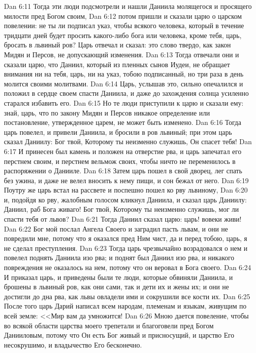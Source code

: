 \vs Dan 6:11 Тогда эти люди подсмотрели и нашли Даниила молящегося и просящего милости пред Богом своим,
\vs Dan 6:12 потом пришли и сказали царю о царском повелении: не ты ли подписал указ, чтобы всякого человека, который в течение тридцати дней будет просить какого-либо бога или человека, кроме тебя, царь, бросать в львиный ров? Царь отвечал и сказал: это слово твердо, как закон Мидян и Персов, не допускающий изменения.
\vs Dan 6:13 Тогда отвечали они и сказали царю, что Даниил, который из пленных сынов Иудеи, не обращает внимания ни на тебя, царь, ни на указ, тобою подписанный, но три раза в день молится своими молитвами.
\vs Dan 6:14 Царь, услышав это, сильно опечалился и положил в сердце своем спасти Даниила, и даже до захождения солнца усиленно старался избавить его.
\vs Dan 6:15 Но те люди приступили к царю и сказали ему: знай, царь, что по закону Мидян и Персов никакое определение или постановление, утвержденное царем, не может быть изменено.
\vs Dan 6:16 Тогда царь повелел, и привели Даниила, и бросили в ров львиный; при этом царь сказал Даниилу: Бог твой, Которому ты неизменно служишь, Он спасет тебя!
\vs Dan 6:17 И принесен был камень и положен на отверстие рва, и царь запечатал его перстнем своим, и перстнем вельмож своих, чтобы ничто не переменилось в распоряжении о Данииле.
\vs Dan 6:18 Затем царь пошел в свой дворец, лег спать без ужина, и даже не велел вносить к нему пищи, и сон бежал от него.
\vs Dan 6:19 Поутру же царь встал на рассвете и поспешно пошел ко рву львиному,
\vs Dan 6:20 и, подойдя ко рву, жалобным голосом кликнул Даниила, и сказал царь Даниилу: Даниил, раб Бога живаго! Бог твой, Которому ты неизменно служишь, мог ли спасти тебя от львов?
\vs Dan 6:21 Тогда Даниил сказал царю: царь! вовеки живи!
\vs Dan 6:22 Бог мой послал Ангела Своего и заградил пасть львам, и они не повредили мне, потому что я оказался пред Ним чист, да и перед тобою, царь, я не сделал преступления.
\vs Dan 6:23 Тогда царь чрезвычайно возрадовался о нем и повелел поднять Даниила изо рва; и поднят был Даниил изо рва, и никакого повреждения не оказалось на нем, потому что он веровал в Бога своего.
\vs Dan 6:24 И приказал царь, и приведены были те люди, которые обвиняли Даниила, и брошены в львиный ров, как они сами, так и дети их и жены их; и они не достигли до дна рва, как львы овладели ими и сокрушили все кости их.
\rsbpar\vs Dan 6:25 После того царь Дарий написал всем народам, племенам и языкам, живущим по всей земле: <<Мир вам да умножится!
\vs Dan 6:26 Мною дается повеление, чтобы во всякой области царства моего трепетали и благоговели пред Богом Данииловым, потому что Он есть Бог живый и присносущий, и царство Его несокрушимо, и владычество Его бесконечно.
